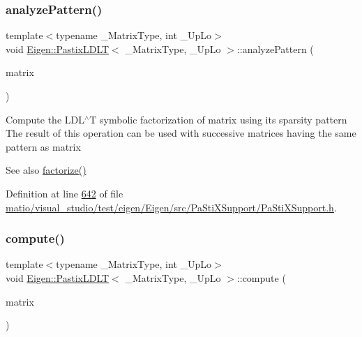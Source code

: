 \subsubsection{\texorpdfstring{analyze\+Pattern()}{analyzePattern()}\hspace{0.1cm}{\footnotesize\ttfamily [2/2]}}
{\footnotesize\ttfamily template$<$typename \+\_\+\+Matrix\+Type, int \+\_\+\+Up\+Lo$>$ \\
void \hyperlink{class_eigen_1_1_pastix_l_d_l_t}{Eigen\+::\+Pastix\+L\+D\+LT}$<$ \+\_\+\+Matrix\+Type, \+\_\+\+Up\+Lo $>$\+::analyze\+Pattern (\begin{DoxyParamCaption}\item[{const Matrix\+Type \&}]{matrix }\end{DoxyParamCaption})\hspace{0.3cm}{\ttfamily [inline]}}

Compute the L\+D\+L$^\wedge$T symbolic factorization of {\ttfamily matrix} using its sparsity pattern The result of this operation can be used with successive matrices having the same pattern as {\ttfamily matrix} \begin{DoxySeeAlso}{See also}
\hyperlink{class_eigen_1_1_pastix_l_d_l_t_a182b0ee676a131413363cc73bc309ef7}{factorize()} 
\end{DoxySeeAlso}


Definition at line \hyperlink{matio_2visual__studio_2test_2eigen_2_eigen_2src_2_pa_sti_x_support_2_pa_sti_x_support_8h_source_l00642}{642} of file \hyperlink{matio_2visual__studio_2test_2eigen_2_eigen_2src_2_pa_sti_x_support_2_pa_sti_x_support_8h_source}{matio/visual\+\_\+studio/test/eigen/\+Eigen/src/\+Pa\+Sti\+X\+Support/\+Pa\+Sti\+X\+Support.\+h}.

\mbox{\label{class_eigen_1_1_pastix_l_d_l_t_abf3135c2dc17d9df26fef80e6456a691}} 
\subsubsection{\texorpdfstring{compute()}{compute()}\hspace{0.1cm}{\footnotesize\ttfamily [1/2]}}
{\footnotesize\ttfamily template$<$typename \+\_\+\+Matrix\+Type, int \+\_\+\+Up\+Lo$>$ \\
void \hyperlink{class_eigen_1_1_pastix_l_d_l_t}{Eigen\+::\+Pastix\+L\+D\+LT}$<$ \+\_\+\+Matrix\+Type, \+\_\+\+Up\+Lo $>$\+::compute (\begin{DoxyParamCaption}\item[{const Matrix\+Type \&}]{matrix }\end{DoxyParamCaption})\hspace{0.3cm}{\ttfamily [inline]}}

